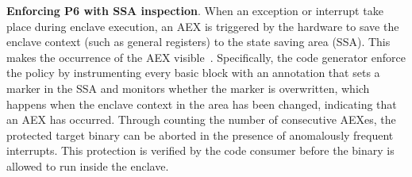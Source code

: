 


\vspace{3pt}\noindent\textbf{Enforcing P6 with SSA inspection}. When an exception or interrupt take place during enclave execution, an AEX is triggered by the hardware to save the enclave context (such as general registers) to the state saving area (SSA). This makes the occurrence of the AEX visible~\cite{gruss2017strong,chen2018racing}. Specifically, the code generator enforce the policy by instrumenting every basic block with an annotation that sets a marker in the SSA and monitors whether the marker is overwritten, which happens when the enclave context in the area has been changed, indicating that an AEX has occurred. Through counting the number of consecutive AEXes, the protected target binary can be aborted in the presence of anomalously frequent interrupts. This protection is verified by the code consumer before the binary is allowed to run inside the enclave. 


